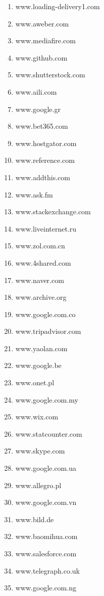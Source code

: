 \begin{enumerate}
\item www.loading-delivery1.com
\item www.aweber.com
\item www.mediafire.com
\item www.github.com
\item www.shutterstock.com
\item www.aili.com
\item www.google.gr
\item www.bet365.com
\item www.hostgator.com
\item www.reference.com
\item www.addthis.com
\item www.ask.fm
\item www.stackexchange.com
\item www.liveinternet.ru
\item www.zol.com.cn
\item www.4shared.com
\item www.naver.com
\item www.archive.org
\item www.google.com.co
\item www.tripadvisor.com
\item www.yaolan.com
\item www.google.be
\item www.onet.pl
\item www.google.com.my
\item www.wix.com
\item www.statcounter.com
\item www.skype.com
\item www.google.com.ua
\item www.allegro.pl
\item www.google.com.vn
\item www.bild.de
\item www.baomihua.com
\item www.salesforce.com
\item www.telegraph.co.uk
\item www.google.com.ng
\end{enumerate}

\clearpage

